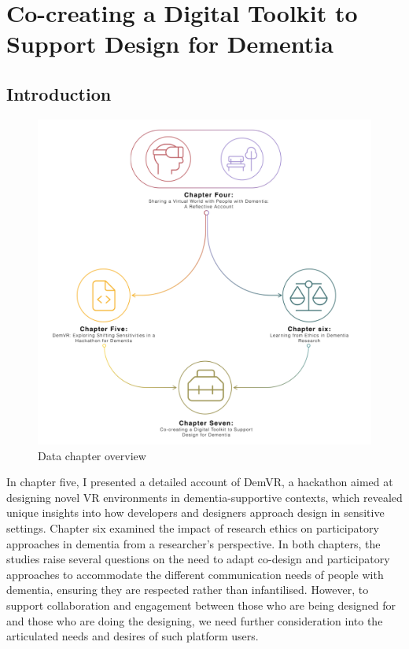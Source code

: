 \chapter{Co-creating a Digital Toolkit to Support Design for Dementia}
\label{D3}

\section{Introduction}
\label{D3:intro}
\begin{figure}[htp]
\centering
\includegraphics[width=0.6\linewidth]{Images/Thesis_Narrative/Narrative_Full.png}
\caption{Data chapter overview}
\label{fig:Thesis_Overview}
\end{figure}

In chapter five, I presented a detailed account of DemVR, a hackathon aimed at designing novel VR environments in dementia-supportive contexts, which revealed unique insights into how developers and designers approach design in sensitive settings. Chapter six examined the impact of research ethics on participatory approaches in dementia from a researcher's perspective. In both chapters, the studies raise several questions on the need to adapt co-design and participatory approaches to accommodate the different communication needs of people with dementia, ensuring they are respected rather than infantilised. However, to support collaboration and engagement between those who are being designed for and those who are doing the designing, we need further consideration into the articulated needs and desires of such platform users.

